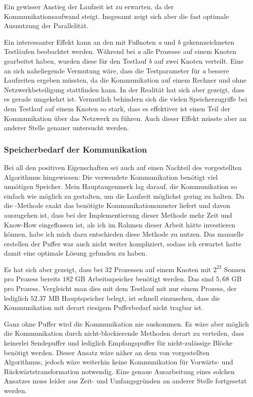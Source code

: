   Ein gewisser Anstieg der Laufzeit ist zu erwarten, da der Kommunikationsaufwand steigt. Insgesamt zeigt sich aber die fast optimale Ausnutzung der Parallelität.
  
  Ein interessanter Effekt kann an den mit Fußnoten \textit{a} und \textit{b} gekennzeichneten Testläufen beobachtet werden. Während bei \textit{a} alle Prozesse auf einem Knoten gearbeitet haben, 
  wurden diese für den Testlauf \textit{b} auf zwei Knoten verteilt. Eine an sich naheliegende Vermutung wäre, dass die Testparameter für \textit{a} bessere Laufzeiten ergeben müssten,
  da die Kommunikation auf einem Rechner und ohne Netzwerkbeteiligung stattfinden kann. In der Realität hat sich aber gezeigt, dass es gerade umgekehrt ist. Vermutlich behindern sich die vielen 
  Speicherzugriffe bei dem Testlauf auf einem Knoten so stark, dass es effektiver ist einen Teil der Kommunikation über das Netzwerk zu führen. Auch dieser Effekt müsste aber an anderer Stelle 
  genauer untersucht werden.
  
  \clearpage
  
  \subsubsection{Speicherbedarf der Kommunikation}
  Bei all den positiven Eigenschaften sei auch auf einen Nachteil des vorgestellten Algorithmus hingewiesen: Die verwendete Kommunikation benötigt viel unnötigen Speicher. Mein Hauptaugenmerk lag
  darauf, die Kommunikation so einfach wie möglich zu gestalten, um die Laufzeit möglichst gering zu halten. Da die -Methode exakt das benötigte Kommunikationsmuster liefert
  und davon auszugehen ist, dass bei der Implementierung dieser Methode mehr Zeit und Know-How eingeflossen ist, als ich im Rahmen dieser Arbeit hätte investieren können, habe ich mich dazu entschieden
  diese Methode zu nutzen. Das manuelle erstellen der Puffer war auch nicht weiter kompliziert, sodass ich erwartet hatte damit eine optimale Lösung gefunden zu haben. 
  
  Es hat sich aber gezeigt, dass bei 32 Prozessen auf einem Knoten mit $2^{22}$ Sonnen pro Prozess bereits $182$ GB Arbeitsspeicher benötigt werden. Das sind $5,68$ GB pro Prozess. Vergleicht man dies
  mit dem Testlauf mit nur einem Prozess, der lediglich $52.37$ MB Hauptspeicher belegt, ist schnell einzusehen, dass die Kommunikation mit derart riesigem Pufferbedarf nicht tragbar ist.
  
  Ganz ohne Puffer wird die Kommunikation nie auskommen. Es wäre aber möglich die Kommunikation durch nicht-blockierende Methoden derart zu verteilen, dass keinerlei Sendepuffer und lediglich 
  Empfangspuffer für nicht-zulässige Blöcke benötigt werden. Dieser Ansatz wäre näher an dem von \citet{distrh2} vorgestellten Algorithmus, jedoch wäre weiterhin keine Kommunikation für Vorwärts- und 
  Rückwärtstransformation notwendig. Eine genaue Ausarbeitung eines solchen Ansatzes muss leider aus Zeit- und Umfangsgründen an anderer Stelle fortgesetzt werden.
  
  